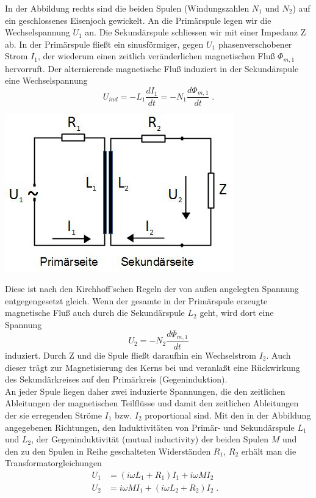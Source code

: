 \noindent
\begin{minipage}{0.6\textwidth}
In der Abbildung rechts sind die beiden Spulen (Windungszahlen $N_1$ und $N_2$) auf ein geschlossenes Eisenjoch gewickelt. An die Primärspule legen wir die Wechselspannung $U_1$ an. Die Sekundärspule schliessen wir mit einer Impedanz Z ab. In der Primärspule fließt ein sinusförmiger, gegen $U_1$ phasenverschobener Strom $I_1$, der wiederum einen zeitlich veränderlichen magnetischen Fluß $\Phi_{m,1}$ hervorruft. Der alternierende magnetische Fluß induziert in der Sekundärspule eine Wechselspannung
\begin{equation}
U_{ind} = -L_1\frac{dI_1}{dt} = -N_1\frac{d\Phi_{m,1}}{dt}\; .
\end{equation}
\end{minipage}
%
\begin{minipage}{0.4\textwidth}
	\includegraphics[width=\textwidth]{Abbildungen/Trafo1.jpg}
	\label{fig:Trafo1}
\end{minipage}
%

\noindent
Diese ist nach den Kirchhoff'schen Regeln der von außen angelegten Spannung entgegengesetzt gleich. Wenn der gesamte in der Primärspule erzeugte magnetische Fluß auch durch die Sekundärspule $L_2$ geht, wird dort eine Spannung
\begin{equation}
U_2 = -N_2\frac{d\Phi_{m,1}}{dt}
\end{equation}
induziert. Durch Z und die Spule fließt daraufhin ein Wechselstrom $I_2$. Auch dieser trägt zur Magnetisierung des Kerns bei und veranlaßt eine Rückwirkung des Sekundärkreises auf den Primärkreis (Gegeninduktion).\\
An jeder Spule liegen daher zwei induzierte Spannungen, die den zeitlichen Ableitungen der magnetischen Teilflüsse und damit den zeitlichen Ableitungen der sie erregenden Ströme $I_1$ bzw. $I_2$ proportional sind. Mit den in der Abbildung angegebenen Richtungen, den Induktivitäten von Primär- und Sekundärspule $L_1$und $L_2$, der Gegeninduktivität (mutual inductivity) der beiden Spulen $M$ und den zu den Spulen in Reihe geschalteten Widerständen $R_1$, $R_2$ erhält man die Transformatorgleichungen
\begin{align*}
U_1 & = (i\omega L_1 + R_1) I_1 + i\omega M I_2 &\\
U_2 & = i\omega M I_1 + (i\omega L_2 + R_2) I_2 \; .
\end{align*}

